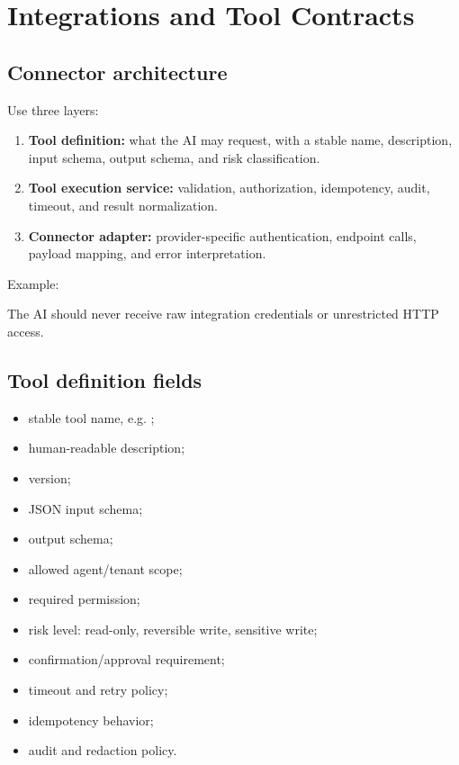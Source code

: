 \chapter{Integrations and Tool Contracts}

\section{Connector architecture}

Use three layers:

\begin{enumerate}
\item \textbf{Tool definition:} what the AI may request, with a stable name, description, input schema, output schema, and risk classification.
\item \textbf{Tool execution service:} validation, authorization, idempotency, audit, timeout, and result normalization.
\item \textbf{Connector adapter:} provider-specific authentication, endpoint calls, payload mapping, and error interpretation.
\end{enumerate}
Example: 

The AI should never receive raw integration credentials or unrestricted HTTP access.

\section{Tool definition fields}

\begin{itemize}
\item stable tool name, e.g. ;
\item human-readable description;
\item version;
\item JSON input schema;
\item output schema;
\item allowed agent/tenant scope;
\item required permission;
\item risk level: read-only, reversible write, sensitive write;
\item confirmation/approval requirement;
\item timeout and retry policy;
\item idempotency behavior;
\item audit and redaction policy.
\end{itemize}
